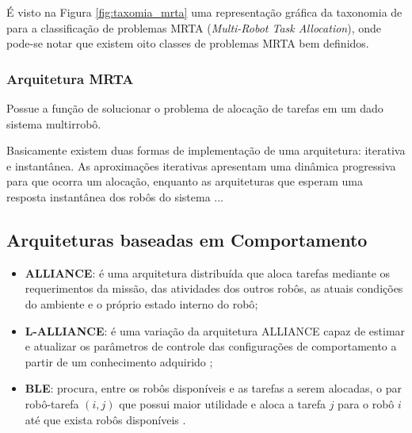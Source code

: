             É visto na Figura \ref{fig:taxomia_mrta} uma representação gráfica da taxonomia de  para a classificação de problemas MRTA (\textit{Multi-Robot Task Allocation}), onde pode-se notar que existem oito classes de problemas MRTA bem definidos.
            
        \subsubsection{Arquitetura MRTA} \label{subsec:arquiteturas_mrta}
            Possue a função de solucionar o problema de alocação de tarefas em um dado sistema multirrobô.
            
            Basicamente existem duas formas de implementação de uma arquitetura: iterativa e instantânea. As aproximações iterativas apresentam uma dinâmica progressiva para que ocorra um alocação, enquanto as arquiteturas que esperam uma resposta instantânea dos robôs do sistema ...
        
            \subsection{Arquiteturas baseadas em Comportamento} \label{subsec:arch_comportamento}
            
                \begin{itemize}
                    \item \textbf{ALLIANCE}: é uma arquitetura distribuída que aloca tarefas mediante os requerimentos da missão, das atividades dos outros robôs, as atuais condições do ambiente e o próprio estado interno do robô\cite{ref:parker1998alliance};
                    
                    \item \textbf{L-ALLIANCE}: é uma variação da arquitetura ALLIANCE capaz de estimar e atualizar os parâmetros de controle das configurações de comportamento a partir de um conhecimento adquirido \cite{ref:parker1996lalliance};
                    
                    \item \textbf{BLE}: procura, entre os robôs disponíveis e as tarefas a serem alocadas, o par robô-tarefa $(i, j)$ que possui maior utilidade e aloca a tarefa $j$ para o robô $i$ até que exista robôs disponíveis \cite{ref:werger2000ble}.
                \end{itemize}
            
